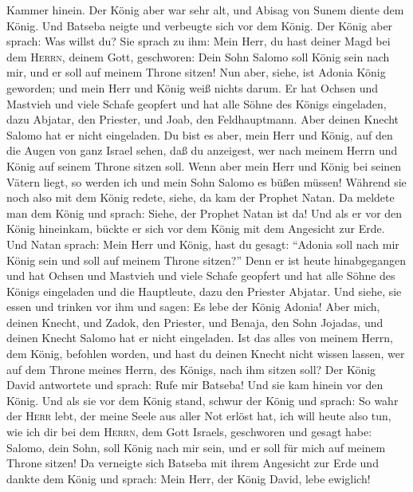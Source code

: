 Kammer hinein. Der König aber war sehr alt, und Abisag von Sunem diente
dem König.  Und Batseba neigte und verbeugte sich vor dem
König. Der König aber sprach: Was willst du?  Sie sprach
zu ihm: Mein Herr, du hast deiner Magd bei dem \textsc{Herrn}, deinem
Gott, geschworen: Dein Sohn Salomo soll König sein nach mir, und er soll
auf meinem Throne sitzen!  Nun aber, siehe, ist Adonia
König geworden; und mein Herr und König weiß nichts darum.
 Er hat Ochsen und Mastvieh und viele Schafe geopfert und
hat alle Söhne des Königs eingeladen, dazu Abjatar, den Priester, und
Joab, den Feldhauptmann. Aber deinen Knecht Salomo hat er nicht
eingeladen.  Du bist es aber, mein Herr und König, auf
den die Augen von ganz Israel sehen, daß du anzeigest, wer nach meinem
Herrn und König auf seinem Throne sitzen soll.  Wenn aber
mein Herr und König bei seinen Vätern liegt, so werden ich und mein Sohn
Salomo es büßen müssen!  Während sie noch also mit dem
König redete, siehe, da kam der Prophet Natan.  Da
meldete man dem König und sprach: Siehe, der Prophet Natan ist da! Und
als er vor den König hineinkam, bückte er sich vor dem König mit dem
Angesicht zur Erde.  Und Natan sprach: Mein Herr und
König, hast du gesagt: ``Adonia soll nach mir König sein und soll auf
meinem Throne sitzen?''  Denn er ist heute hinabgegangen
und hat Ochsen und Mastvieh und viele Schafe geopfert und hat alle Söhne
des Königs eingeladen und die Hauptleute, dazu den Priester Abjatar. Und
siehe, sie essen und trinken vor ihm und sagen: Es lebe der König
Adonia!  Aber mich, deinen Knecht, und Zadok, den
Priester, und Benaja, den Sohn Jojadas, und deinen Knecht Salomo hat er
nicht eingeladen.  Ist das alles von meinem Herrn, dem
König, befohlen worden, und hast du deinen Knecht nicht wissen lassen,
wer auf dem Throne meines Herrn, des Königs, nach ihm sitzen soll?
 Der König David antwortete und sprach: Rufe mir Batseba!
Und sie kam hinein vor den König.  Und als sie vor dem
König stand, schwur der König und sprach: So wahr der \textsc{Herr}
lebt, der meine Seele aus aller Not erlöst hat,  ich will
heute also tun, wie ich dir bei dem \textsc{Herrn}, dem Gott Israels,
geschworen und gesagt habe: Salomo, dein Sohn, soll König nach mir sein,
und er soll für mich auf meinem Throne sitzen!  Da
verneigte sich Batseba mit ihrem Angesicht zur Erde und dankte dem König
und sprach: Mein Herr, der König David, lebe ewiglich! 
